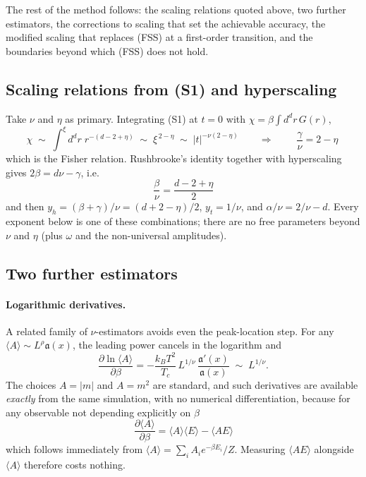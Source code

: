 \documentclass[10pt,a4paper]{article}
\theoremstyle{remark}
\begin{document}
The rest of the method follows: the scaling
relations quoted above, two further estimators, the corrections to scaling that
set the achievable accuracy, the modified scaling that replaces (FSS) at a
first-order transition, and the boundaries beyond which (FSS) does not hold.

\subsection{Scaling relations from (S1) and hyperscaling}
\label{app:fssrelations}

Take $\nu$ and $\eta$ as primary. Integrating (S1) at
$t=0$ with $\chi=\beta\int d^{d}r\,G(r)$,
\[
\chi\;\sim\;\int^{\xi} d^{d}r\;r^{-(d-2+\eta)}\;\sim\;\xi^{\,2-\eta}
\;\sim\;|t|^{-\nu(2-\eta)}
\qquad\Longrightarrow\qquad
\;\frac{\gamma}{\nu}=2-\eta\
\]
which is the Fisher relation. Rushbrooke's identity together with hyperscaling
gives $2\beta=d\nu-\gamma$, i.e.
\[
\;\frac{\beta}{\nu}=\frac{d-2+\eta}{2}\
\]
and then $y_h=(\beta+\gamma)/\nu=(d+2-\eta)/2$, $y_t=1/\nu$, and
$\alpha/\nu=2/\nu-d$. Every exponent below is one of these combinations; there
are no free parameters beyond $\nu$ and $\eta$ (plus $\omega$ and the
non-universal amplitudes).


\subsection{Two further estimators}

\paragraph{Logarithmic derivatives.} A related family of $\nu$-estimators avoids
even the peak-location step. For any $\langle A\rangle\sim
L^{\rho}\mathfrak{a}(x)$, the leading power cancels in the logarithm and
\[
\frac{\partial\ln\langle A\rangle}{\partial\beta}
=-\frac{k_BT^{2}}{T_c}\,L^{1/\nu}\,
\frac{\mathfrak{a}'(x)}{\mathfrak{a}(x)}\;\sim\;L^{1/\nu} .
\]
The choices $A=|m|$ and $A=m^{2}$ are standard, and such derivatives are
available \emph{exactly} from the same simulation, with no numerical
differentiation, because for any observable not depending explicitly on $\beta$
\[
\;\frac{\partial\langle A\rangle}{\partial\beta}
=\langle A\rangle\langle E\rangle-\langle AE\rangle\
\]
which follows immediately from $\langle A\rangle=\sum_iA_ie^{-\beta E_i}/Z$.
Measuring $\langle AE\rangle$ alongside $\langle A\rangle$ therefore costs
nothing.
\end{document}
